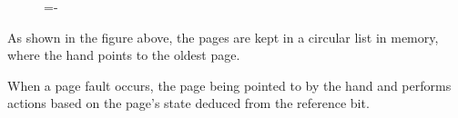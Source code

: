 \documentclass[a4paper]{systems-software}
\begin{document}
\begin{figure}[H]
  \lineskip=-\fboxrule
\end{figure}

As shown in the figure above, the pages are kept in a circular list in memory, where the hand points to the oldest page.

When a page fault occurs, the page being pointed to by the hand and performs actions based on the page's state deduced from the reference bit.
\end{document}
